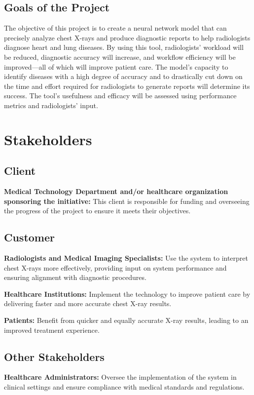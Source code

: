 \documentclass[12pt]{article}
\begin{document}
\subsection{Goals of the Project}
The objective of this project is to create a neural network model that can precisely analyze chest 
X-rays and produce diagnostic reports to help radiologists diagnose heart and lung diseases. By 
using this tool, radiologists' workload will be reduced, diagnostic accuracy will increase, and 
workflow efficiency will be improved—all of which will improve patient care. The model's capacity 
to identify diseases with a high degree of accuracy and to drastically cut down on the time and 
effort required for radiologists to generate reports will determine its success. The tool's 
usefulness and efficacy will be assessed using performance metrics and radiologists' input.

\section{Stakeholders}
\subsection{Client}
\textbf{Medical Technology Department and/or healthcare organization sponsoring the initiative: }
This client is responsible for funding and overseeing the progress of the project to ensure it 
meets their objectives.

\subsection{Customer}
\textbf{Radiologists and Medical Imaging Specialists: } Use the system to interpret chest X-rays 
more effectively, providing input on system performance and ensuring alignment with diagnostic 
procedures.

\textbf{Healthcare Institutions: } Implement the technology to improve patient care by delivering 
faster and more accurate chest X-ray results.

\textbf{Patients: } Benefit from quicker and equally accurate X-ray results, leading to an 
improved treatment experience.

\subsection{Other Stakeholders}
\textbf{Healthcare Administrators: } Oversee the implementation of the system in clinical settings 
and ensure compliance with medical standards and regulations.
\end{document}
